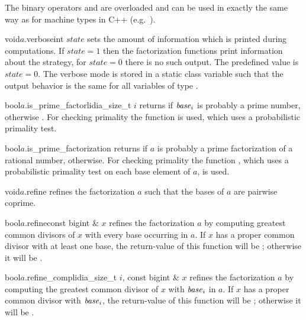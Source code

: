 The binary operators \code{==} and \code{!=} are overloaded and can be used in exactly the same
way as for machine types in C++ (e.g.~).



\HIGH


\begin{fcode}{void}{$a$.verbose}{int $\mathit{state}$}
  sets the amount of information which is printed during computations.  If $\mathit{state} = 1$
  then the factorization functions print information about the strategy, for $\mathit{state} =
  0$ there is no such output.  The predefined value is $\mathit{state} = 0$.  The verbose mode
  is stored in a static class variable such that the output behavior is the same for all
  variables of type .
\end{fcode}

\begin{fcode}{bool}{$a$.is_prime_factor}{lidia_size_t $i$}
  returns \TRUE if $\mathit{base}_i$ is probably a prime number, otherwise \FALSE.  For checking
  primality the  function  is used, which uses a probabilistic
  primality test.
\end{fcode}

\begin{fcode}{bool}{$a$.is_prime_factorization}{}
  returns \TRUE if $a$ is probably a prime factorization of a rational number, \FALSE otherwise.
  For checking primality the  function , which uses a
  probabilistic primality test on each base element of $a$, is used.
\end{fcode}

\begin{fcode}{void}{$a$.refine}{}
  refines the factorization $a$ such that the bases of $a$ are pairwise coprime.
\end{fcode}

\begin{fcode}{bool}{$a$.refine}{const bigint & $x$}
  refines the factorization $a$ by computing greatest common divisors of $x$ with every base
  occurring in $a$.  If $x$ has a proper common divisor with at least one base, the return-value
  of this function will be \TRUE; otherwise it will be \FALSE.
\end{fcode}

\begin{fcode}{bool}{$a$.refine_comp}{lidia_size_t $i$, const bigint & $x$}
  refines the factorization $a$ by computing the greatest common divisor of $x$ with $\mathit{base}_i$
  in $a$.  If $x$ has a proper common divisor with $\mathit{base}_i$, the return-value of this function
  will be \TRUE; otherwise it will be \FALSE.
\end{fcode}

